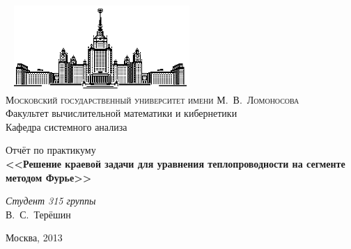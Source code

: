 \documentclass[11pt]{article}
\begin{document}
\thispagestyle{empty}

\begin{center}
\ \vspace{0cm} %
\includegraphics[width=0.5\textwidth]{msu.eps}\\
{\scshape Московский государственный университет имени М.~В.~Ломоносова}\\
Факультет вычислительной математики и кибернетики\\
Кафедра системного анализа

\vfill
{\LARGE Отчёт по практикуму} \\
\vspace{1cm}
{\Huge\bfseries <<Решение краевой задачи для уравнения теплопроводности на сегменте методом Фурье>>}
\end{center}

\vspace{1cm}
\begin{flushright}
\large
\textit{Студент 315 группы}\\
В.~С.~Терёшин\\
\end{flushright}

\vfill
\begin{center}
Москва, 2013
\end{center}

\pagebreak
\end{document}
